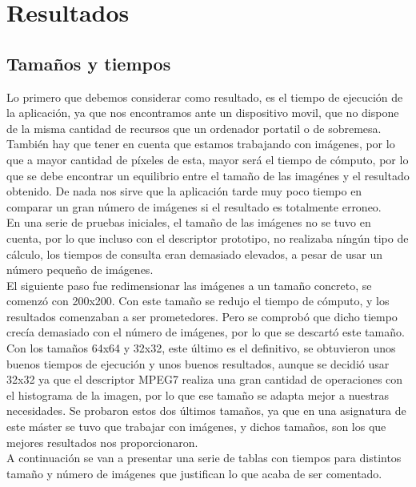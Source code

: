 \chapter{Resultados}
\label{cap:resultados}

\section{Tamaños y tiempos}
Lo primero que debemos considerar como resultado, es el tiempo de ejecución de la aplicación, ya que nos encontramos ante un dispositivo movil, que no dispone de la misma cantidad de recursos que un ordenador portatil o de sobremesa.\\

También hay que tener en cuenta que estamos trabajando con imágenes, por lo que a mayor cantidad de píxeles de esta, mayor será el tiempo de cómputo, por lo que se debe encontrar un equilibrio entre el tamaño de las imagénes y el resultado obtenido. De nada nos sirve que la aplicación tarde muy poco tiempo en comparar un gran número de imágenes si el resultado es totalmente erroneo.\\

En una serie de pruebas iniciales, el tamaño de las imágenes no se tuvo en cuenta, por lo que incluso con el descriptor prototipo, no realizaba níngún tipo de cálculo, los tiempos de consulta eran demasiado elevados, a pesar de usar un número pequeño de imágenes.\\

El siguiente paso fue redimensionar las imágenes a un tamaño concreto, se comenzó con 200x200. Con este tamaño se redujo el tiempo de cómputo, y los resultados comenzaban a ser prometedores. Pero se comprobó que dicho tiempo crecía demasiado con el número de imágenes, por lo que se descartó este tamaño.\\

Con los tamaños 64x64 y 32x32, este último es el definitivo, se obtuvieron unos buenos tiempos de ejecución y unos buenos resultados, aunque se decidió usar 32x32 ya que el descriptor MPEG7 realiza una gran cantidad de operaciones con el histograma de la imagen, por lo que ese tamaño se adapta mejor a nuestras necesidades. Se probaron estos dos últimos tamaños, ya que en una asignatura de este máster se tuvo que trabajar con imágenes, y dichos tamaños, son los que mejores resultados nos proporcionaron.\\

A continuación se van a presentar una serie de tablas con tiempos para distintos tamaño y número de imágenes que justifican lo que acaba de ser comentado.\\


